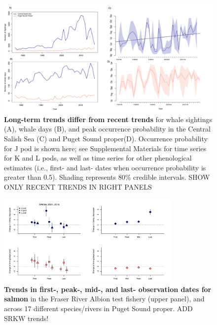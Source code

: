 \documentclass{article}
\begin{document}
\begin{figure}[p]
\includegraphics{../analyses/figures/OrcaPhenPlots/timeseries_1976_assumeSRKW2regs.pdf} 
\caption{\textbf{Long-term trends differ from recent trends} for whale sightings (A), whale days (B), and peak occurrence probability in the Central Salish Sea (C) and Puget Sound proper(D). Occurrence probability for J pod is shown here; see Supplemental Materials for time series for K and L pods, as well as time series for other phenological estimates (i.e., first- and last- dates when occurrence probability is greater than 0.5). Shading represents 80\% credible intervals. SHOW ONLY RECENT TRENDS IN RIGHT PANELS}
 \label{fig:timeseries}
 \end{figure}
 

\begin{figure}[p]
\includegraphics[width=0.8\textwidth]{../analyses/figures/salmon_shifts_lmm.pdf} 
\caption{\textbf{Trends in first-, peak-, mid-, and last- observation dates for salmon} in the Fraser River Albion test fishery (upper panel), and across 17 different species/rivers in Puget Sound proper. ADD SRKW trends!}
 \label{fig:shifts}
 \end{figure}
\end{document}
